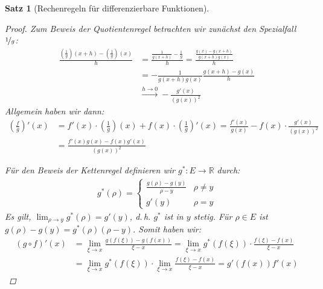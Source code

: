\documentclass[ngerman,titlepage,twoside, parskip=half*]{scrreprt}
\newcommand*{\R}{\mathbb{R}}
\theoremstyle{break}
\newtheorem{theorem}{Satz}[section]
\theoremstyle{nonumberbreak}
\newtheorem{proof}{Beweis:}
\begin{document}
\begin{theorem}[Rechenregeln für differenzierbare Funktionen]
\begin{proof}
  Zum Beweis der Quotientenregel betrachten wir zunächst den Spezialfall
  $\nicefrac{1}{g}$:
  \begin{align*}
    \frac{(\frac{1}{g})(x+h)-(\frac{1}{g})(x)}{h} &= \frac{\frac{1}{g(x+h)}-
       \frac{1}{g}}{h}=\frac{\frac{g(x)-g(x+h)}{g(x+h)g(x)}}{h}\\
    &= -\frac{1}{g(x+h)g(x)} \frac{g(x+h)-g(x)}{h}\\
    &\xrightarrow{h\rightarrow0} -\frac{g'(x)}{(g(x))^{2}}
  \end{align*}
  Allgemein haben wir dann:
  \begin{align*}
    \left(\frac{f}{g}\right)'(x) &= f'(x)\cdot(\frac{1}{g})(x)+
       f(x)\cdot(\frac{1}{g})'(x)=
       \frac{f'(x)}{g(x)}-f(x)\cdot\frac{g'(x)}{(g(x))^{2}}\\
    &= \frac{f'(x)g(x)-f(x)g'(x)}{(g(x))^{2}}
  \end{align*}

  Für den Beweis der Kettenregel definieren wir $g^{*}\colon E\rightarrow\R$
  durch:
  \begin{gather*}
    g^{*}(\rho)=
       \begin{cases}
	 \frac{g(\rho)-g(y)}{\rho-y} & \rho\neq y\\
	 g'(y) & \rho=y
       \end{cases}
  \end{gather*}
  Es gilt, $\lim_{\rho\rightarrow y} g^{*}(\rho)= g'(y)$, d.\,h. $g^{*}$ ist
  in $y$ stetig. Für $\rho\in E$ ist $g(\rho)-g(y)= g^{*}(\rho)(\rho-y)$.
  Somit haben wir:
  \begin{align*}
    (g\circ f)'(x) &= \lim_{\xi\rightarrow x} \frac{g(f(\xi))-g(f(x))}{\xi-x}=
       \lim_{\xi\rightarrow x} g^{*}(f(\xi))\cdot\frac{f(\xi)-f(x)}{\xi-x}\\
    &= \lim_{\xi\rightarrow x} g^{*}(f(\xi))\cdot\lim_{\xi\rightarrow x}
       \frac{f(\xi)-f(x)}{\xi-x}= g'(f(x))f'(x)
  \end{align*}
\end{proof}
\end{theorem}
\end{document}
